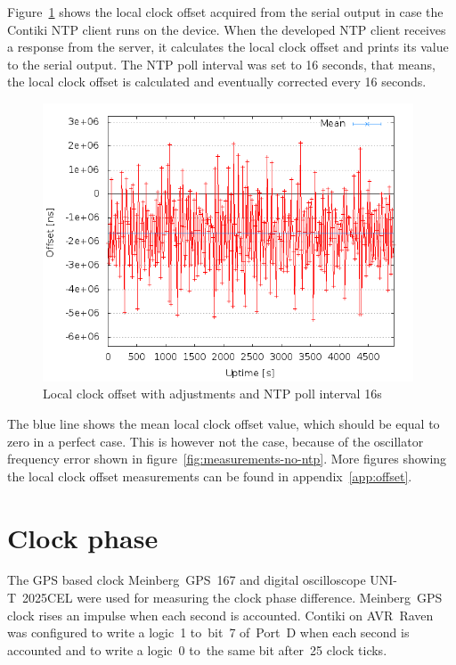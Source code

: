 Figure~\ref{fig:measurements-ntp-serial} shows the local clock offset
acquired from the serial output in case the Contiki NTP client runs on the device.
When the developed NTP client receives a response from the server,
it calculates the local clock offset and prints its value to the serial output.
The NTP poll interval was set to 16 seconds, that means, the local clock offset
is calculated and eventually corrected every 16 seconds.
\begin{figure}[H]
  \centering
  \includegraphics[width=11cm,keepaspectratio]{fig/poll-16s.png}
  \caption{Local clock offset with adjustments and NTP poll interval 16s}
  \label{fig:measurements-ntp-serial}
\end{figure}
The blue line shows the mean local clock offset value,
which should be equal to zero in a perfect case.
This is however not the case, because of the oscillator frequency error
shown in figure~\ref{fig:measurements-no-ntp}.
More figures showing the local clock offset measurements
can be found in appendix~\ref{app:offset}.

\section{Clock phase}
The GPS based clock Meinberg~GPS~167 and digital oscilloscope UNI-T~2025CEL
were used for measuring the clock phase difference.
Meinberg~GPS clock rises an impulse when each second is accounted.
Contiki on AVR~Raven was configured to write a logic~1
to~bit~7 of~Port~D when each second is accounted
and to write a logic~0 to~the same bit after~25 clock ticks.

